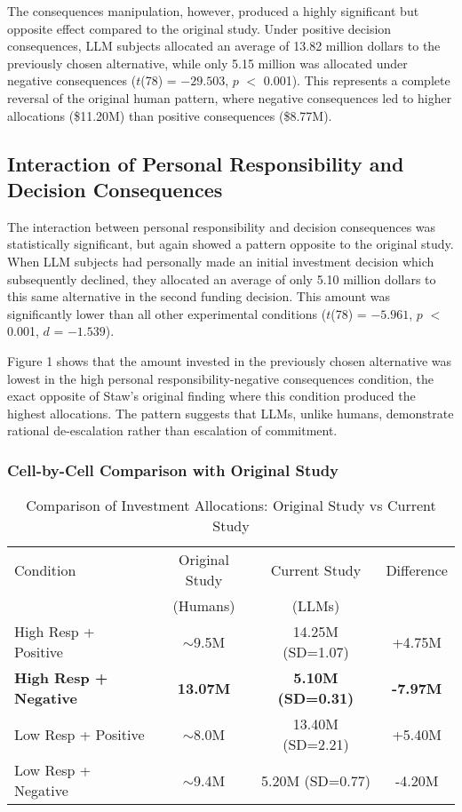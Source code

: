 \documentclass{article}
\begin{document}
The consequences manipulation, however, produced a highly significant but opposite effect compared to the original study. Under positive decision consequences, LLM subjects allocated an average of 13.82 million dollars to the previously chosen alternative, while only 5.15 million was allocated under negative consequences ($t$(78) = $-29.503$, $p$ $<$ 0.001). This represents a complete reversal of the original human pattern, where negative consequences led to higher allocations (\$11.20M) than positive consequences (\$8.77M).

\subsection{Interaction of Personal Responsibility and Decision Consequences}

The interaction between personal responsibility and decision consequences was statistically significant, but again showed a pattern opposite to the original study. When LLM subjects had personally made an initial investment decision which subsequently declined, they allocated an average of only 5.10 million dollars to this same alternative in the second funding decision. This amount was significantly lower than all other experimental conditions ($t$(78) = $-5.961$, $p$ $<$ 0.001, $d$ = $-1.539$).

Figure 1 shows that the amount invested in the previously chosen alternative was lowest in the high personal responsibility-negative consequences condition, the exact opposite of Staw's original finding where this condition produced the highest allocations. The pattern suggests that LLMs, unlike humans, demonstrate rational de-escalation rather than escalation of commitment.

\subsubsection{Cell-by-Cell Comparison with Original Study}

\begin{table}[htbp]
\centering
\caption{Comparison of Investment Allocations: Original Study vs Current Study}
\begin{tabular}{lccc}
\hline
Condition & Original Study & Current Study & Difference \\
 & (Humans) & (LLMs) & \\
\hline
High Resp + Positive & $\sim$9.5M & 14.25M (SD=1.07) & +4.75M \\
\textbf{High Resp + Negative} & \textbf{13.07M} & \textbf{5.10M (SD=0.31)} & \textbf{-7.97M} \\
Low Resp + Positive & $\sim$8.0M & 13.40M (SD=2.21) & +5.40M \\
Low Resp + Negative & $\sim$9.4M & 5.20M (SD=0.77) & -4.20M \\
\hline
\end{tabular}
\end{table}
\end{document}
